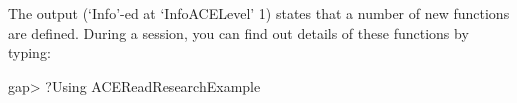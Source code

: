 The output (`Info'-ed at `InfoACELevel' 1) states that a number of new
functions are defined. During a  {\GAP}  session,  you  can  find  out
details of these functions by typing:

\begintt
gap> ?Using ACEReadResearchExample
\endtt

%
%
%
%
%
%
%
